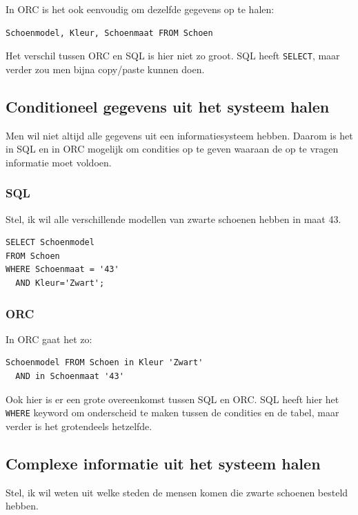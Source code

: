 \documentclass{article}
\begin{document}
In ORC is het ook eenvoudig om dezelfde gegevens op te halen:

\begin{verbatim}
Schoenmodel, Kleur, Schoenmaat FROM Schoen
\end{verbatim}

Het verschil tussen ORC en SQL is hier niet zo groot. SQL heeft \verb+SELECT+,
maar verder zou men bijna copy/paste kunnen doen.

\subsection{Conditioneel gegevens uit het systeem halen}

Men wil niet altijd alle gegevens uit een informatiesysteem hebben. Daarom is
het in SQL en in ORC mogelijk om condities op te geven waaraan de op te vragen
informatie moet voldoen.

\subsubsection{SQL}

Stel, ik wil alle verschillende modellen van zwarte schoenen hebben in maat 43.

\begin{verbatim}
SELECT Schoenmodel 
FROM Schoen 
WHERE Schoenmaat = '43' 
  AND Kleur='Zwart';
\end{verbatim}

\subsubsection{ORC}

In ORC gaat het zo: 

\begin{verbatim}
Schoenmodel FROM Schoen in Kleur 'Zwart' 
  AND in Schoenmaat '43'
\end{verbatim}

Ook hier is er een grote overeenkomst tussen SQL en ORC. SQL heeft hier het 
\verb+WHERE+ keyword om onderscheid te maken tussen de condities en de 
tabel, maar verder is het grotendeels hetzelfde. 

\subsection{Complexe informatie uit het systeem halen}

Stel, ik wil weten uit welke steden de mensen komen die zwarte schoenen 
besteld hebben.
\end{document}
